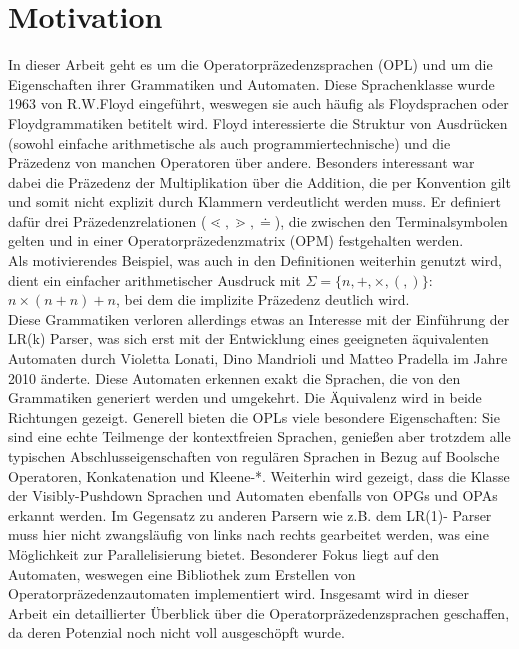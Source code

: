 \section{Motivation}
In dieser Arbeit geht es um die Operatorpräzedenzsprachen (OPL) und um die Eigenschaften ihrer Grammatiken und Automaten. Diese Sprachenklasse wurde 1963 von R.W.Floyd eingeführt, weswegen sie auch häufig als Floydsprachen oder Floydgrammatiken betitelt wird. Floyd interessierte die Struktur von Ausdrücken (sowohl einfache arithmetische als auch programmiertechnische) und die Präzedenz von manchen Operatoren über andere. Besonders interessant war dabei die Präzedenz der Multiplikation über die Addition, die per Konvention gilt und somit nicht explizit durch Klammern verdeutlicht werden muss. Er definiert dafür drei Präzedenzrelationen ($\lessdot, \gtrdot, \doteq$), die zwischen den Terminalsymbolen gelten und in einer Operatorpräzedenzmatrix (OPM) festgehalten werden.\\
Als motivierendes Beispiel, was auch in den Definitionen weiterhin genutzt wird, dient ein einfacher arithmetischer Ausdruck mit $\Sigma = \{n, +, \times, (, )\}$:\\ $ n \times (n + n) + n$, bei dem die implizite Präzedenz deutlich wird.\\
Diese Grammatiken verloren allerdings etwas an Interesse mit der Einführung der LR(k) Parser, was sich erst mit der Entwicklung eines geeigneten äquivalenten Automaten durch Violetta Lonati, Dino Mandrioli und Matteo Pradella im Jahre 2010 änderte. Diese Automaten erkennen exakt die Sprachen, die von den Grammatiken generiert werden und umgekehrt. Die Äquivalenz wird in beide Richtungen gezeigt.
Generell bieten die OPLs viele besondere Eigenschaften: Sie sind eine echte Teilmenge der kontextfreien Sprachen, genießen aber trotzdem alle typischen Abschlusseigenschaften von regulären Sprachen in Bezug auf Boolsche Operatoren, Konkatenation und Kleene-*. 
Weiterhin wird gezeigt, dass die Klasse der Visibly-Pushdown Sprachen und Automaten ebenfalls von OPGs und OPAs erkannt werden. Im Gegensatz zu anderen Parsern wie z.B. dem LR(1)- Parser muss hier nicht zwangsläufig von links nach rechts gearbeitet werden, was eine Möglichkeit zur Parallelisierung bietet.
Besonderer Fokus liegt auf den Automaten, weswegen eine Bibliothek zum Erstellen von Operatorpräzedenzautomaten implementiert wird. Insgesamt wird in dieser Arbeit ein detaillierter Überblick über die Operatorpräzedenzsprachen geschaffen, da deren Potenzial noch nicht voll ausgeschöpft wurde.